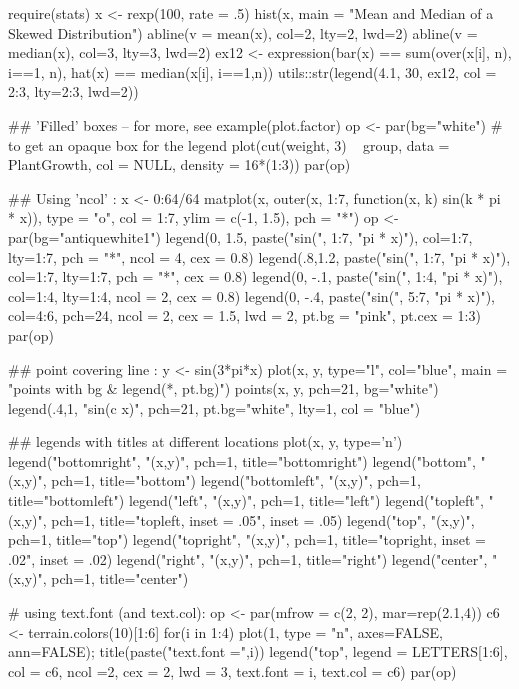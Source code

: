 \begin{Examples}
\begin{ExampleCode}
require(stats)
x <- rexp(100, rate = .5)
hist(x, main = "Mean and Median of a Skewed Distribution")
abline(v = mean(x),   col=2, lty=2, lwd=2)
abline(v = median(x), col=3, lty=3, lwd=2)
ex12 <- expression(bar(x) == sum(over(x[i], n), i==1, n),
                   hat(x) == median(x[i], i==1,n))
utils::str(legend(4.1, 30, ex12, col = 2:3, lty=2:3, lwd=2))

## 'Filled' boxes -- for more, see example(plot.factor)
op <- par(bg="white") # to get an opaque box for the legend
plot(cut(weight, 3) ~ group, data = PlantGrowth, col = NULL,
     density = 16*(1:3))
par(op)

## Using 'ncol' :
x <- 0:64/64
matplot(x, outer(x, 1:7, function(x, k) sin(k * pi * x)),
        type = "o", col = 1:7, ylim = c(-1, 1.5), pch = "*")
op <- par(bg="antiquewhite1")
legend(0, 1.5, paste("sin(", 1:7, "pi * x)"), col=1:7, lty=1:7,
       pch = "*", ncol = 4, cex = 0.8)
legend(.8,1.2, paste("sin(", 1:7, "pi * x)"), col=1:7, lty=1:7,
       pch = "*", cex = 0.8)
legend(0, -.1, paste("sin(", 1:4, "pi * x)"), col=1:4, lty=1:4,
       ncol = 2, cex = 0.8)
legend(0, -.4, paste("sin(", 5:7, "pi * x)"), col=4:6,  pch=24,
       ncol = 2, cex = 1.5, lwd = 2, pt.bg = "pink", pt.cex = 1:3)
par(op)

## point covering line :
y <- sin(3*pi*x)
plot(x, y, type="l", col="blue",
    main = "points with bg & legend(*, pt.bg)")
points(x, y, pch=21, bg="white")
legend(.4,1, "sin(c x)", pch=21, pt.bg="white", lty=1, col = "blue")

## legends with titles at different locations
plot(x, y, type='n')
legend("bottomright", "(x,y)", pch=1, title="bottomright")
legend("bottom", "(x,y)", pch=1, title="bottom")
legend("bottomleft", "(x,y)", pch=1, title="bottomleft")
legend("left", "(x,y)", pch=1, title="left")
legend("topleft", "(x,y)", pch=1, title="topleft, inset = .05",
       inset = .05)
legend("top", "(x,y)", pch=1, title="top")
legend("topright", "(x,y)", pch=1, title="topright, inset = .02",
       inset = .02)
legend("right", "(x,y)", pch=1, title="right")
legend("center", "(x,y)", pch=1, title="center")

# using text.font (and text.col):
op <- par(mfrow = c(2, 2), mar=rep(2.1,4))
c6 <- terrain.colors(10)[1:6]
for(i in 1:4) {
   plot(1, type = "n", axes=FALSE, ann=FALSE); title(paste("text.font =",i))
   legend("top", legend = LETTERS[1:6], col = c6,
          ncol =2, cex = 2, lwd = 3, text.font = i, text.col = c6)
}
par(op)
\end{ExampleCode}
\end{Examples}

